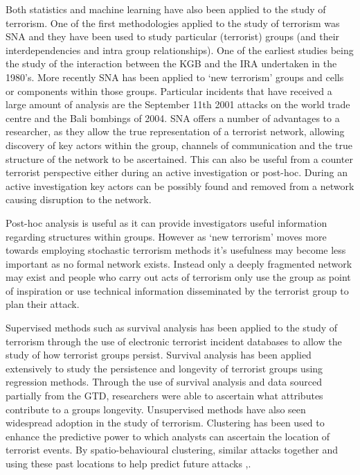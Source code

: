 Both statistics and machine learning have also been applied to the study of terrorism. One of the first methodologies applied to the study of terrorism was SNA and they have been used to study particular (terrorist) groups (and their interdependencies and intra group relationships). One of the earliest studies being the study of the interaction between the KGB and the IRA undertaken in the 1980’s. More recently SNA has been applied to ‘new terrorism’ groups and cells or components within those groups. Particular incidents that have received a large amount of analysis are the September 11th 2001 attacks on the world trade centre and the Bali bombings of 2004. SNA offers a number of advantages to a researcher, as they allow the true representation of a terrorist network, allowing discovery of key actors within the group, channels of communication and the true structure of the network to be ascertained. This can also be useful from a counter terrorist perspective either during an active investigation or post-hoc. During an active investigation key actors can be possibly found and removed from a network causing disruption to the network. 

Post-hoc analysis is useful as it can provide investigators useful information regarding structures within groups. However as ‘new terrorism’ moves more towards employing stochastic terrorism methods it’s usefulness may become less important as no formal network exists. Instead only a deeply fragmented network may exist and people who carry out acts of terrorism only use the group as point of inspiration or use technical information disseminated by the terrorist group to plan their attack.

Supervised methods such as survival analysis has been applied to the study of terrorism through the use of electronic terrorist incident databases to allow the study of how terrorist groups persist. Survival analysis has been applied extensively to study the persistence and longevity of terrorist groups using regression methods. Through the use of survival analysis and data sourced partially from the GTD, researchers  \citep{young2014survival} were able to ascertain what attributes contribute to a groups longevity. Unsupervised methods have also seen widespread adoption in the study of terrorism. Clustering has been used to enhance the predictive power to which analysts can ascertain the location of terrorist events. By spatio-behavioural clustering, similar attacks together and using these past locations to help predict future attacks \citep{townsley2008space},\citep{brown2004spatial}.

